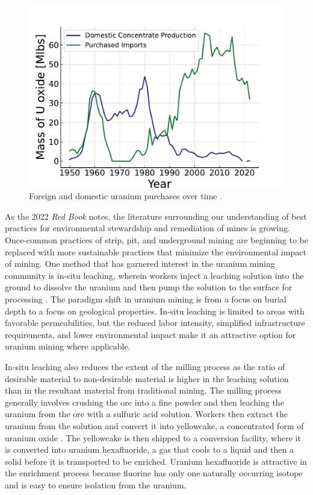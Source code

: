 \begin{figure}[H]
   \centering
   \includegraphics[scale=0.7]{images/intro/uranium_production_imports.pdf}
   \caption{Foreign and domestic uranium purchases over time \cite{eia_monthly_energy_review_2024}.}
   \label{fig:foregin_u3o8}
\end{figure}

As the 2022 \textit{Red Book} notes, the literature surrounding our understanding of best practices for environmental stewardship and remediation of mines is growing. Once-common practices of strip, pit, and underground
mining are beginning to be replaced with more sustainable practices that
minimize the environmental impact of mining. One method that has garnered
interest in the uranium mining community is in-situ leaching, wherein workers
inject a leaching solution into the ground to dissolve the uranium and then
pump the solution to the surface for processing \cite{insitu_review_2024}. The
paradigm shift in uranium mining is from a focus on burial depth to a focus on
geological properties. In-situ leaching is limited to areas with favorable
permeabilities, but the reduced labor intensity, simplified infrastructure
requirements, and lower environmental impact make it an attractive option for
uranium mining where applicable.

In-situ leaching also reduces the extent of the milling process as the ratio of
desirable material to non-desirable material is higher in the leaching solution
than in the resultant material from traditional mining. The milling process
generally involves crushing the ore into a fine powder and then leaching the
uranium from the ore with a sulfuric acid solution. Workers then extract the
uranium from the solution and convert it into yellowcake, a concentrated form
of uranium oxide \cite{milling_uranium_2022}. The yellowcake is then shipped to
a conversion facility, where it is converted into uranium hexafluoride, a gas
that cools to a liquid and then a solid before it is transported to be
enriched. Uranium hexafluoride is attractive in the enrichment process because
fluorine has only one naturally occurring isotope and is easy to
ensure isolation from the uranium.

